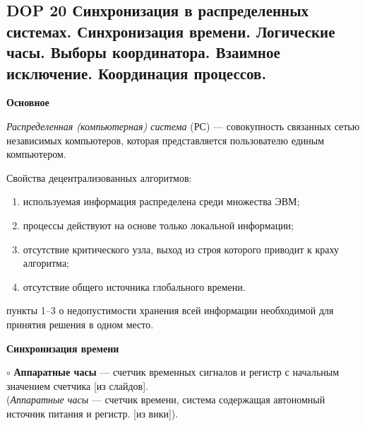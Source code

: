 \newcommand{\notsure}[1]{(видимо: #1)}
\newcommand{\aboba}[2]{\textbf{\LARGE dop #1. #2}}
\newcommand{\multicom}[1]{}
\newcommand{\lulz}[1]{}
\newcommand{\wantsayInstead}[1]{}

\subsection{DOP 20 Синхронизация  в  распределенных  системах.  Синхронизация  времени.  Логические  часы.  Выборы координатора. Взаимное исключение. Координация процессов.}

\bigbreak

\centerline{\textbf{Основное}}

\textit{Распределенная (компьютерная) система} (РС) --– совокупность связанных
сетью независимых компьютеров, которая представляется
пользователю единым компьютером. 


Свойства децентрализованных алгоритмов:
\vspace{-0.7em}
\begin{enumerate}
\setlength\itemsep{-0.4em}
\item используемая информация распределена среди множества ЭВМ;
\item процессы действуют на основе только локальной информации;
\item отсутствие критического узла, выход из строя которого приводит к краху алгоритма;
\item отсутствие общего источника глобального времени.
\end{enumerate}
пункты 1--3 о недопустимости хранения всей информации необходимой для принятия решения в одном место.


\centerline{\textbf{Синхронизация времени}}

$\circ$
\textbf{Аппаратные часы} --- счетчик временных сигналов и регистр с начальным значением счетчика [из слайдов].
\\
(\textit{Аппаратные часы} --- счетчик времени, система содержащая автономный источник питания и регистр. [из вики]).

